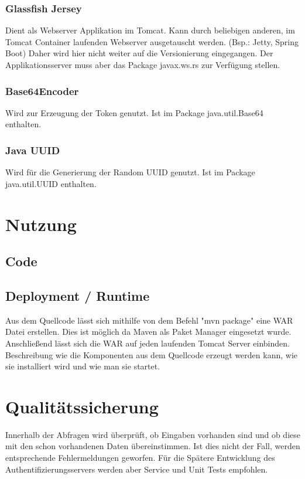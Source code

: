 \documentclass[german]{book}
\begin{document}
\subsubsection{Glassfish Jersey}
Dient als Webserver Applikation im Tomcat. Kann durch beliebigen anderen, im Tomcat Container laufenden Webserver ausgetauscht werden. (Bsp.: Jetty, Spring Boot) Daher wird hier nicht weiter auf die Versionierung eingegangen. Der Applikationsserver muss aber das Package javax.ws.rs zur Verfügung stellen.

\subsubsection{Base64Encoder}
Wird zur Erzeugung der Token genutzt. Ist im Package java.util.Base64 enthalten.

\subsubsection{Java UUID}
Wird für die Generierung der Random UUID genutzt. Ist im Package java.util.UUID enthalten.

\section{Nutzung}
\subsection{Code}



\subsection{Deployment / Runtime}
Aus dem Quellcode lässt sich mithilfe von dem Befehl "mvn package" eine WAR Datei erstellen. Dies ist möglich da Maven als Paket Manager eingesetzt wurde. Anschließend lässt sich die WAR auf jeden laufenden Tomcat Server einbinden. 
\newline
\newline
Beschreibung wie die Komponenten aus dem Quellcode erzeugt werden kann,
wie sie installiert wird und wie man sie startet.

\section{Qualitätssicherung}
Innerhalb der Abfragen wird überprüft, ob Eingaben vorhanden sind und ob diese mit den schon vorhandenen Daten übereinstimmen. Ist dies nicht der Fall, werden entsprechende Fehlermeldungen geworfen. Für die Spätere Entwicklung des Authentifizierungsservers werden aber Service und Unit Tests empfohlen. 
\end{document}
